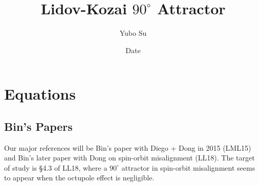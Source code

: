 \documentclass[11pt,
        usenames, %
        dvipsnames %
    ]{article}
\begin{document}
\def\Snospace~{\S{}} %
\renewcommand*{\sectionautorefname}{\Snospace}
\renewcommand*{\appendixautorefname}{\Snospace}
\renewcommand*{\figureautorefname}{Fig.}
\renewcommand*{\equationautorefname}{Eq.}
\renewcommand*{\tableautorefname}{Tab.}

\onehalfspacing

\pagestyle{fancy}
\rhead{}
\cfoot{\thepage/\pageref{LastPage}}

\title{Lidov-Kozai $90^\circ$ Attractor}
\author{Yubo Su}
\date{Date}

\maketitle

\section{Equations}

\subsection{Bin's Papers}

Our major references will be Bin's paper with Diego + Dong in 2015 (LML15) and
Bin's later paper with Dong on spin-orbit misalignment (LL18). The target of
study is \S4.3 of LL18, where a $90^\circ$ attractor in spin-orbit misalignment
seems to appear when the octupole effect is negligible.
\end{document}
